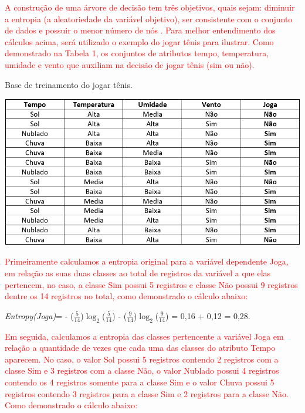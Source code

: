 \par
\textcolor{red}{A construção de uma árvore de decisão tem três objetivos, quais sejam: diminuir a entropia (a aleatoriedade da variável objetivo), ser consistente com o conjunto de dados e possuir o menor número de nós \cite{Steiner2004}. Para melhor entendimento dos cálculos acima, será utilizado o exemplo do jogar tênis para ilustrar. Como demonstrado na Tabela 1, os conjuntos de atributos tempo, temperatura, umidade e vento que auxiliam na decisão de jogar tênis (sim ou não).}

\par
\begin{table}[!htp]
	\begin{center}
    \caption{\label{fig:waveform_fig} Base de treinamento do jogar tênis.}
	\includegraphics[scale=0.65]{Figuras/Jogar_tenis.png}
	\end{center}
\end{table}

\par
\textcolor{red}{Primeiramente calculamos a entropia original para a variável dependente Joga, em relação as suas duas classes ao total de registros da variável a que elas pertencem, no caso, a classe Sim possui 5 registros e classe Não possui 9 registros dentre os 14 registros no total, como demonstrado o cálculo abaixo:}

\textit{Entropy(Joga)}={ - ($\frac{5}{14}$)$\log_{2}$($\frac{5}{14}$) - ($\frac{9}{14}$)$\log_{2}$($\frac{9}{14}$) = 0,16 + 0,12 = 0,28.}

\par
\textcolor{red}{Em seguida, calculamos a entropia das classes pertencente a variável Joga em relação a quantidade de vezes que cada uma das classes do atributo Tempo aparecem. No caso, o valor Sol possui 5 registros contendo 2 registros com a classe Sim e 3 registros com a classe Não, o valor Nublado possui 4 registros contendo os 4 registros somente para a classe Sim e o valor Chuva possui 5 registros contendo 3 registros para a classe Sim e 2 registros para a classe Não. Como demonstrado o cálculo abaixo:}

